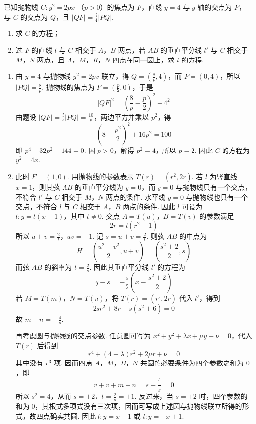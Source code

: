 \begin{problem}
已知抛物线 \(C: y^{2} = 2px \) （\(p > 0\)）的焦点为 \(F\)，直线 \(y = 4\) 与 \(y\) 轴的交点为 \(P\)，与 \(C\) 的交点为 \(Q\)，且 \(|QF| = \frac{5}{4} |PQ|\).

\begin{enumerate}
\item 求 \(C\) 的方程；
\item 过 \(F\) 的直线 \(l\) 与 \(C\) 相交于 \(A\)，\(B\) 两点，若 \(AB\) 的垂直平分线 \(l'\) 与 \(C\) 相交于 \(M\)，\(N\) 两点，且 \(A\)，\(M\)，\(B\)，\(N\) 四点在同一圆上，求 \(l\) 的方程.
\end{enumerate}
\end{problem}

\begin{solution}
\begin{enumerate}
\item 由 \(y=4\) 与抛物线 \(y^2=2px\) 联立，得
\(Q=(\frac{8}{p},4)\)，而 \(P=(0,4)\)，所以
\(|PQ|=\frac{8}{p}\). 抛物线的焦点为 \(F=(\frac p2,0)\)，于是
\[
|QF|^2=\left(\frac{8}{p}-\frac p2\right)^2+4^2
\]
由题设 \(|QF|=\frac54|PQ|=\frac{10}{p}\)，两边平方并乘以 \(p^2\)，得
\[
\left(8-\frac{p^2}{2}\right)^2+16p^2=100
\]
即 \(p^4+32p^2-144=0\). 因 \(p>0\)，解得 \(p^2=4\)，所以 \(p=2\). 因此
\(C\) 的方程为 \(y^2=4x\).
\item 此时 \(F=(1,0)\). 用抛物线的参数表示
\(T(r)=(r^2,2r)\). 若 \(l\) 为竖直线 \(x=1\)，则其弦 \(AB\) 的垂直平分线为 \(y=0\)，而 \(y=0\) 与抛物线只有一个交点，不符合 \(l'\) 与 \(C\) 相交于 \(M\)，\(N\) 两点的条件. 水平线 \(y=0\) 与抛物线也只有一个交点，不符合 \(l\) 与 \(C\) 相交于 \(A\)，\(B\) 两点的条件. 因此 \(l\) 可设为
\(l:y=t(x-1)\)，其中 \(t\ne0\). 交点 \(A=T(u)\)，\(B=T(v)\) 的参数满足
\[
2r=t(r^2-1)
\]
所以 \(u+v=\frac{2}{t}\)，\(uv=-1\). 记 \(s=u+v=\frac{2}{t}\). 则弦 \(AB\) 的中点为
\[
H=\left(\frac{u^2+v^2}{2},u+v\right)
=\left(\frac{s^2+2}{2},s\right)
\]
而弦 \(AB\) 的斜率为 \(t=\frac{2}{s}\). 因此其垂直平分线 \(l'\) 的方程为
\[
y-s=-\frac{s}{2}\left(x-\frac{s^2+2}{2}\right)
\]
若 \(M=T(m)\)，\(N=T(n)\)，将 \(T(r)=(r^2,2r)\) 代入 \(l'\)，得到
\[
2sr^2+8r-s(s^2+6)=0
\]
故 \(m+n=-\frac{4}{s}\).

再考虑圆与抛物线的交点参数. 任意圆可写为
\(x^2+y^2+\lambda x+\mu y+\nu=0\)，代入 \(T(r)\) 后得到
\[
r^4+(4+\lambda)r^2+2\mu r+\nu=0
\]
其中没有 \(r^3\) 项. 因而四点 \(A\)，\(M\)，\(B\)，\(N\) 共圆的必要条件为四个参数之和为 \(0\)，即
\[
u+v+m+n=s-\frac4s=0
\]
所以 \(s^2=4\)，从而 \(s=\pm2\)，\(t=\frac2s=\pm1\). 反过来，当 \(s=\pm2\) 时，四个参数的和为 \(0\)，其根式多项式没有三次项，因而可写成上述圆与抛物线联立所得的形式，故四点确实共圆.
因此 \(l:y=x-1\) 或 \(l:y=-x+1\).
\end{enumerate}
\end{solution}

